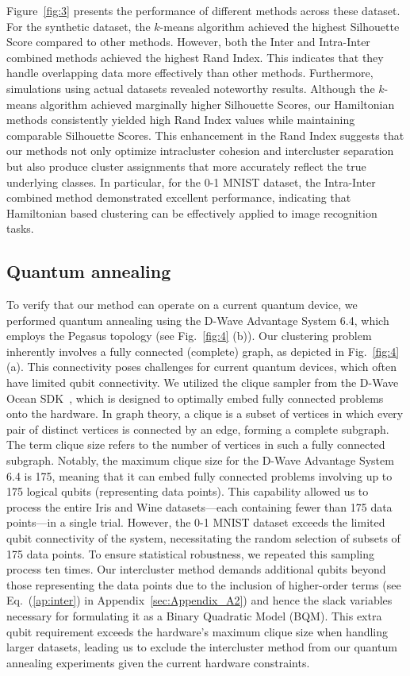 \documentclass[showpacs,twocolumn,superscriptaddress]{revtex4-2}
\begin{document}
Figure~\ref{fig:3} presents the performance of different methods across these dataset. For the synthetic dataset, the $k$-means algorithm achieved the highest Silhouette Score compared to other methods. However, both the Inter and Intra-Inter combined methods achieved the highest Rand Index. This indicates that they handle overlapping data more effectively than other methods.
Furthermore, simulations using actual datasets revealed noteworthy results. Although the $k$-means algorithm achieved marginally higher Silhouette Scores, our Hamiltonian methods consistently yielded high Rand Index values while maintaining comparable Silhouette Scores. This enhancement in the Rand Index suggests that our methods not only optimize intracluster cohesion and intercluster separation but also produce cluster assignments that more accurately reflect the true underlying classes. In particular, for the 0-1 MNIST dataset, the Intra-Inter combined method demonstrated excellent performance, indicating that Hamiltonian based clustering can be effectively applied to image recognition tasks.

\subsection{Quantum annealing}

To verify that our method can operate on a current quantum device, we performed quantum annealing using the D-Wave Advantage System 6.4, which employs the Pegasus topology (see Fig.~\ref{fig:4} (b)). Our clustering problem inherently involves a fully connected (complete) graph, as depicted in Fig.~\ref{fig:4} (a). This connectivity poses challenges for current quantum devices, which often have limited qubit connectivity. We utilized the clique sampler from the D-Wave Ocean SDK~\cite{boothby2020fast}, which is designed to optimally embed fully connected problems onto the hardware. In graph theory, a clique is a subset of vertices in which every pair of distinct vertices is connected by an edge, forming a complete subgraph. The term clique size refers to the number of vertices in such a fully connected subgraph. Notably, the maximum clique size for the D-Wave Advantage System 6.4 is 175, meaning that it can embed fully connected problems involving up to 175 logical qubits (representing data points). This capability allowed us to process the entire Iris and Wine datasets---each containing fewer than 175 data points---in a single trial. However, the 0-1 MNIST dataset exceeds the limited qubit connectivity of the system, necessitating the random selection of subsets of 175 data points. To ensure statistical robustness, we repeated this sampling process ten times. Our intercluster method demands additional qubits beyond those representing the data points due to the inclusion of higher-order terms (see Eq.~(\ref{ap:inter}) in Appendix~\ref{sec:Appendix_A2}) and hence the slack variables necessary for formulating it as a Binary Quadratic Model (BQM). This extra qubit requirement exceeds the hardware's maximum clique size when handling larger datasets, leading us to exclude the intercluster method from our quantum annealing experiments given the current hardware constraints.
\end{document}
